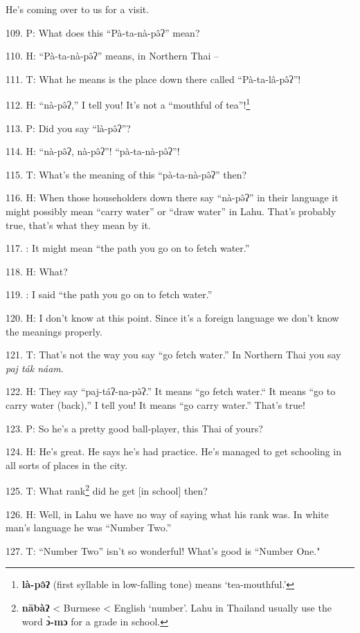 He's coming over to us for a visit.

109. P: What does this ``Pà-ta-nà-pə̂ʔ'' mean?

110. H: ``Pà-ta-nà-pə̂ʔ'' means, in Northern Thai --

111. T: What he means is the place down there called ``Pà-ta-lâ-pə̂ʔ''!

112. H: ``nà-pə̂ʔ,'' I tell you! It's not a ``mouthful
of tea''!\footnote{\textbf{là-pə̂ʔ} (first syllable in low-falling tone) means `tea-mouthful.'}

113. P: Did you say ``là-pə̂ʔ''?

114. H: ``nà-pə̂ʔ, nà-pə̂ʔ''! ``pà-ta-nà-pə̂ʔ''!

115. T: What's the meaning of this ``pà-ta-nà-pə̂ʔ'' then?

116. H: When those householders down there say ``nà-pə̂ʔ'' in
their language it might possibly mean ``carry water'' or ``draw water'' in Lahu.
That's probably true, that's what they mean by it.

117. : It might mean ``the path you go on to fetch water.''

118. H: What?

119. : I said ``the path you go on to fetch water.''

120. H: I don't know at this point. Since it's a foreign language we don't know
the meanings properly.

121. T: That's not the way you say ``go fetch water.'' In Northern
Thai you say \textit{paj ták náam}.

122. H: They say ``paj-táʔ-na-pə̂ʔ.'' It means ``go
fetch water.`` It means ``go to carry water (back),'' I
tell you! It means ``go carry water.'' That's true!


123. P: So he's a pretty good ball-player, this Thai of yours?

124. H: He's great. He says he's had practice. He's managed to get schooling in
all sorts of places in the city.

125. T: What rank\footnote{\textbf{nābàʔ} < Burmese < English `number'. Lahu in Thailand usually use the word \textbf{ɔ̀-mɔ} for a grade in school.} did he get [in school] then?

126. H: Well, in Lahu we have no way of saying what his rank was. In white man's
language he was ``Number Two.''

127. T: ``Number Two'' isn't so wonderful! What's good is ``Number
One."

